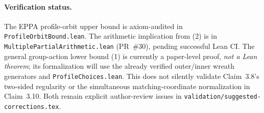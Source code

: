 \documentclass[11pt,a4paper]{article}
\begin{document}
\paragraph{Verification status.}
The EPPA profile-orbit upper bound is axiom-audited
in \texttt{ProfileOrbitBound.lean}.
The arithmetic implication from (2) is in
\texttt{MultiplePartialArithmetic.lean}
(PR~\#30), pending successful Lean CI.
The general group-action lower bound (1)
is currently a paper-level proof, \emph{not a Lean
theorem}; its formalization will use the already
verified outer/inner wreath generators and
\texttt{ProfileChoices.lean}.
This does not silently validate Claim~3.8's
two-sided regularity or the simultaneous
matching-coordinate normalization in Claim~3.10.
Both remain explicit author-review issues in
\texttt{validation/suggested-corrections.tex}.
\end{document}
